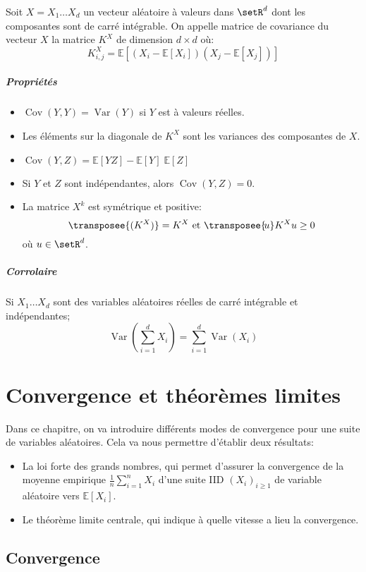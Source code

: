 \documentclass[a4paper,10pt,french,openany]{memoir}
\newcommand{\Esper}{\mathbb{E}}
\newcommand{\Xoned}{X_1\dots X_d}
\DeclareMathOperator{\Var}{Var}
\DeclareMathOperator{\Cov}{Cov}
\begin{document}
Soit $X=\Xoned$ un vecteur aléatoire à valeurs dans $\setR^d$ dont les composantes sont de carré intégrable. On appelle matrice de covariance du vecteur $X$ la matrice $K^X$ de dimension $d\times d$ où:
\[ K_{i,j}^X = \Esper[(X_i - \Esper[X_i]) (X_j-\Esper[X_j])] \]

\paragraph{Propriétés}
\begin{itemize}
 \item $\Cov(Y,Y)=\Var(Y)$ si $Y$ est à valeurs réelles.
 \item Les éléments sur la diagonale de $K^X$ sont les variances des composantes de $X$.
 \item $\Cov(Y,Z) = \Esper[YZ] - \Esper[Y]\;\Esper[Z]$
 \item Si $Y$ et $Z$ sont indépendantes, alors $\Cov(Y,Z)=0$.
 \item La matrice $X^k$ est symétrique et positive:
 \[ \transposee{(K^X)} = K^X \text{ et } \transposee{\!u} K^X u \geq 0 \] où $u\in\setR^d$.
\end{itemize}

\paragraph{Corrolaire}
Si $\Xoned$ sont des variables aléatoires réelles de carré intégrable et indépendantes;
\[ \Var\left(\sum_{i=1}^d X_i\right) = \sum_{i=1}^d \Var(X_i) \]

\chapter{Convergence et théorèmes limites}

Dans ce chapitre, on va introduire différents modes de convergence pour une suite de variables aléatoires. Cela va nous permettre d'établir deux résultats:
\begin{itemize}
 \item La loi forte des grands nombres, qui permet d'assurer la convergence de la moyenne empirique $\frac 1 n \sum_{i=1}^n X_i$ d'une suite IID $(X_i)_{i\geq1}$ de variable aléatoire vers $\Esper[X_i]$.
 
 \item Le théorème limite centrale, qui indique à quelle vitesse a lieu la convergence.
\end{itemize}

\section{Convergence}
\end{document}
